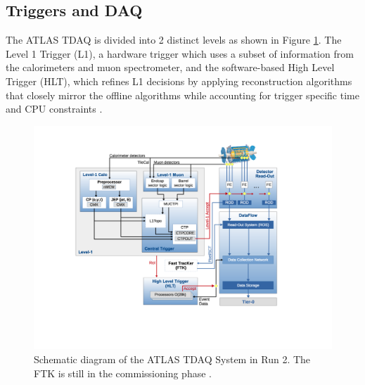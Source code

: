 \subsection{Triggers and DAQ}
The ATLAS TDAQ is divided into 2 distinct levels as shown in Figure \ref{fig:trig_diag}. The Level 1 Trigger (L1), a hardware trigger which uses a subset of information from the calorimeters and muon spectrometer, and the software-based High Level Trigger (HLT), which refines L1 decisions by applying reconstruction algorithms that closely mirror the offline algorithms while accounting for trigger specific time and CPU constraints \cite{trig_2015}.\\

\begin{figure}[h]
    \centering
    \includegraphics[width=5.5in]{figures/chapter3/trig_diag.pdf}
    \caption{Schematic diagram of the ATLAS TDAQ System in Run 2. The FTK is still in the commissioning phase \cite{trig_2015}.}
    \label{fig:trig_diag}
\end{figure}

